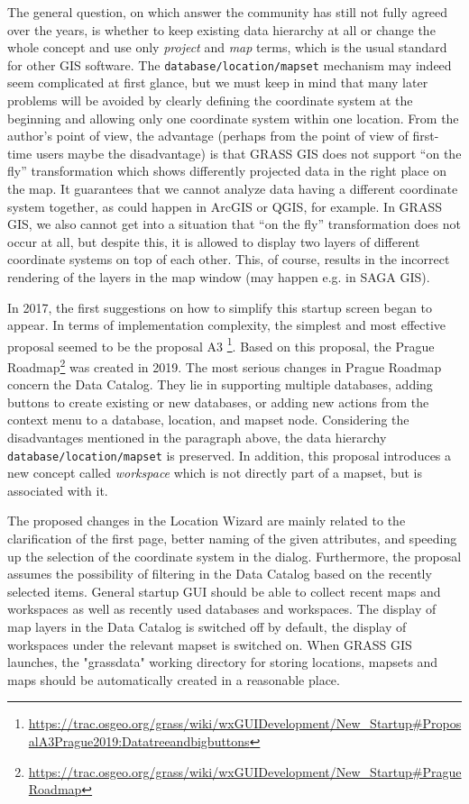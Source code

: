 \documentclass[a4paper,10pt,twoside]{article}
\begin{document}
The general question, on which answer the community has still not fully agreed over the years, is whether to keep existing data hierarchy at all or change the whole concept and use only \textit{project} and \textit{map} terms, which is the usual standard for other GIS software. The \texttt {database/location/mapset} mechanism may indeed seem complicated at first glance, but we must keep in mind that many later problems will be avoided by clearly defining the coordinate system at the beginning and allowing only one coordinate system within one location. From the author’s point of view, the advantage (perhaps from the point of view of first-time users maybe the disadvantage) is that GRASS GIS does not support ``on the fly'' transformation which shows differently projected data in the right place on the map. It guarantees that we cannot analyze data having a different coordinate system together, as could happen in ArcGIS or QGIS, for example. In GRASS GIS, we also cannot get into a situation that ``on the fly'' transformation does not occur at all, but despite this, it is allowed to display two layers of different coordinate systems on top of each other. This, of course, results in the incorrect rendering of the layers in the map window (may happen e.g. in SAGA GIS). 

In 2017, the first suggestions on how to simplify this startup screen began to appear. In terms of implementation complexity, the simplest and most effective proposal seemed to be the proposal A3 \footnote{\url{https://trac.osgeo.org/grass/wiki/wxGUIDevelopment/New\_Startup\#ProposalA3Prague2019:Datatreeandbigbuttons}}. Based on this proposal, the Prague Roadmap\footnote{\url{https://trac.osgeo.org/grass/wiki/wxGUIDevelopment/New\_Startup\#PragueRoadmap}} was created in 2019. 
The most serious changes in Prague Roadmap concern the Data Catalog. They lie in supporting multiple databases, adding buttons to create existing or new databases, or adding new actions from the context menu to a database, location, and mapset node. Considering the disadvantages mentioned in the paragraph above, the data hierarchy \texttt{database/location/mapset} is preserved. In addition, this proposal introduces a new concept called \textit{workspace} which is not directly part of a mapset, but is associated with it.

The proposed changes in the Location Wizard are mainly related to the clarification of the first page, better naming of the given attributes, and speeding up the selection of the coordinate system in the dialog. Furthermore, the proposal assumes the possibility of filtering in the Data Catalog based on the recently selected items. General startup GUI should be able to collect recent maps and workspaces as well as recently used databases and workspaces. The display of map layers in the Data Catalog is switched off by default, the display of workspaces under the relevant mapset is switched on. When GRASS GIS launches, the "grassdata" working directory for storing locations, mapsets and maps should be automatically created in a reasonable place.
\end{document}
